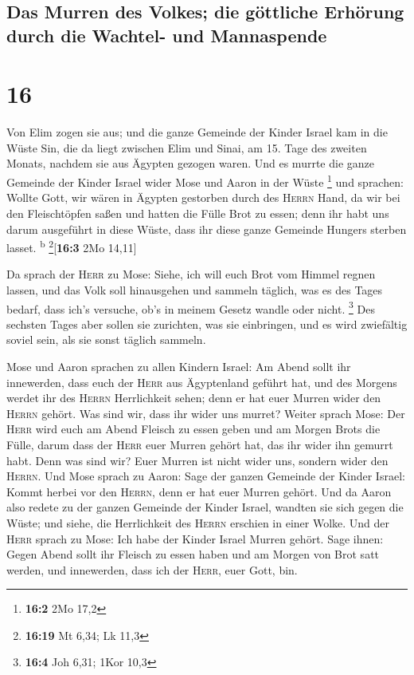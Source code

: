 \hypertarget{das-murren-des-volkes-die-guxf6ttliche-erhuxf6rung-durch-die-wachtel--und-mannaspende}{%
\subsection{Das Murren des Volkes; die göttliche Erhörung durch die
Wachtel- und
Mannaspende}\label{das-murren-des-volkes-die-guxf6ttliche-erhuxf6rung-durch-die-wachtel--und-mannaspende}}

\hypertarget{section-15}{%
\section{16}\label{section-15}}

 Von Elim zogen sie aus; und die ganze Gemeinde der Kinder
Israel kam in die Wüste Sin, die da liegt zwischen Elim und Sinai, am
15. Tage des zweiten Monats, nachdem sie aus Ägypten gezogen waren.
 Und es murrte die ganze Gemeinde der Kinder Israel wider
Mose und Aaron in der Wüste \footnote{\textbf{16:2} 2Mo 17,2}
 und sprachen: Wollte Gott, wir wären in Ägypten gestorben
durch des \textsc{Herrn} Hand, da wir bei den Fleischtöpfen saßen und
hatten die Fülle Brot zu essen; denn ihr habt uns darum ausgeführt in
diese Wüste, dass ihr diese ganze Gemeinde Hungers sterben lasset.
\textsuperscript{b} \footnote{\textbf{16:19} Mt 6,34; Lk 11,3}{[}\textbf{16:3}
2Mo 14,11{]}

 Da sprach der \textsc{Herr} zu Mose: Siehe, ich will euch
Brot vom Himmel regnen lassen, und das Volk soll hinausgehen und sammeln
täglich, was es des Tages bedarf, dass ich's versuche, ob's in meinem
Gesetz wandle oder nicht. \footnote{\textbf{16:4} Joh 6,31; 1Kor 10,3}
 Des sechsten Tages aber sollen sie zurichten, was sie
einbringen, und es wird zwiefältig soviel sein, als sie sonst täglich
sammeln.

 Mose und Aaron sprachen zu allen Kindern Israel: Am Abend
sollt ihr innewerden, dass euch der \textsc{Herr} aus Ägyptenland
geführt hat,  und des Morgens werdet ihr des
\textsc{Herrn} Herrlichkeit sehen; denn er hat euer Murren wider den
\textsc{Herrn} gehört. Was sind wir, dass ihr wider uns murret?
 Weiter sprach Mose: Der \textsc{Herr} wird euch am Abend
Fleisch zu essen geben und am Morgen Brots die Fülle, darum dass der
\textsc{Herr} euer Murren gehört hat, das ihr wider ihn gemurrt habt.
Denn was sind wir? Euer Murren ist nicht wider uns, sondern wider den
\textsc{Herrn}.  Und Mose sprach zu Aaron: Sage der ganzen
Gemeinde der Kinder Israel: Kommt herbei vor den \textsc{Herrn}, denn er
hat euer Murren gehört.  Und da Aaron also redete zu der
ganzen Gemeinde der Kinder Israel, wandten sie sich gegen die Wüste; und
siehe, die Herrlichkeit des \textsc{Herrn} erschien in einer Wolke.
 Und der \textsc{Herr} sprach zu Mose: 
Ich habe der Kinder Israel Murren gehört. Sage ihnen: Gegen Abend sollt
ihr Fleisch zu essen haben und am Morgen von Brot satt werden, und
innewerden, dass ich der \textsc{Herr}, euer Gott, bin.

